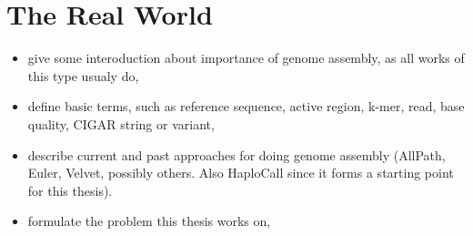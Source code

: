 \section{The Real World}
\label{sec:real-world}



\begin{itemize}
\item give some interoduction about importance of genome assembly, as all works of this type usualy do,
\item define basic terms, such as reference sequence, active region, k-mer, read, base quality, CIGAR string or variant,
\item describe current and past approaches for doing genome assembly (AllPath, Euler, Velvet, possibly others. Also HaploCall since it forms a starting point for this thesis). 
\item formulate the problem this thesis works on,
\end{itemize}

